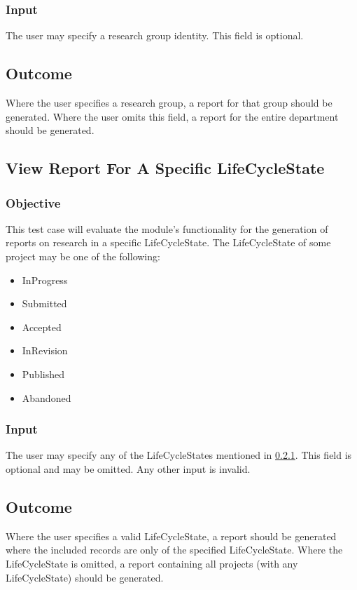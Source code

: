 \subsubsection{Input}
The user may specify a research group identity. This field is optional.

\subsection{Outcome}
Where the user specifies a research group,  a report for that group should be generated. 
Where the user omits this field, a report for the entire department should be generated.

\subsection{View Report For A Specific LifeCycleState}
\subsubsection{Objective} \label{TC_LifeCycleState_Obj}
This test case will evaluate the module's functionality for the generation of reports on research in a specific LifeCycleState. The LifeCycleState of some project may be one of the following:
\begin{itemize}
	\item InProgress
	\item Submitted
	\item Accepted
	\item InRevision
	\item Published
	\item Abandoned
\end{itemize}
\subsubsection{Input}
The user may specify any of the LifeCycleStates mentioned in \ref{TC_LifeCycleState_Obj}. 
This field is optional and may be omitted. Any other input is invalid.

\subsection{Outcome}
Where the user specifies a valid LifeCycleState, a report should be generated where the included records are only of the specified LifeCycleState. 
Where the LifeCycleState is omitted, a report containing all projects (with any LifeCycleState) should be generated.


